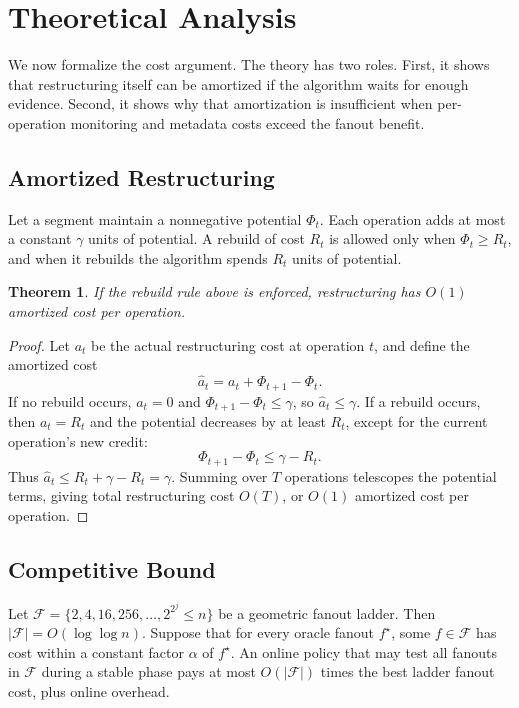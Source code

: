 \documentclass[sigconf,screen]{acmart}
\newtheorem{theorem}{Theorem}
\begin{document}
\section{Theoretical Analysis}

We now formalize the cost argument.  The theory has two roles.  First, it
shows that restructuring itself can be amortized if the algorithm waits for
enough evidence.  Second, it shows why that amortization is insufficient when
per-operation monitoring and metadata costs exceed the fanout benefit.

\subsection{Amortized Restructuring}

Let a segment maintain a nonnegative potential \(\Phi_t\).  Each operation
adds at most a constant \(\gamma\) units of potential.  A rebuild of cost
\(R_t\) is allowed only when \(\Phi_t \ge R_t\), and when it rebuilds the
algorithm spends \(R_t\) units of potential.

\begin{theorem}
If the rebuild rule above is enforced, restructuring has \(O(1)\) amortized
cost per operation.
\end{theorem}

\begin{proof}
Let \(a_t\) be the actual restructuring cost at operation \(t\), and define
the amortized cost
\[
  \hat{a}_t = a_t + \Phi_{t+1}-\Phi_t .
\]
If no rebuild occurs, \(a_t=0\) and \(\Phi_{t+1}-\Phi_t\le\gamma\), so
\(\hat{a}_t\le\gamma\).  If a rebuild occurs, then \(a_t=R_t\) and the
potential decreases by at least \(R_t\), except for the current operation's
new credit:
\[
  \Phi_{t+1}-\Phi_t \le \gamma - R_t .
\]
Thus \(\hat{a}_t \le R_t+\gamma-R_t=\gamma\).  Summing over \(T\)
operations telescopes the potential terms, giving total restructuring cost
\(O(T)\), or \(O(1)\) amortized cost per operation.
\end{proof}

\subsection{Competitive Bound}

Let \(\mathcal{F}=\{2,4,16,256,\ldots,2^{2^j}\le n\}\) be a geometric
fanout ladder.  Then \(|\mathcal{F}|=O(\log\log n)\).  Suppose that for every
oracle fanout \(f^\star\), some \(f\in\mathcal{F}\) has cost within a constant
factor \(\alpha\) of \(f^\star\).  An online policy that may test all fanouts
in \(\mathcal{F}\) during a stable phase pays at most \(O(|\mathcal{F}|)\)
times the best ladder fanout cost, plus online overhead.
\end{document}

